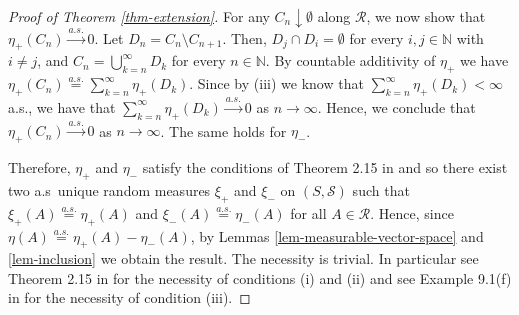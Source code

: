 \documentclass{article}
\theoremstyle{plain}
\theoremstyle{remark}
\begin{document}
\begin{proof}[Proof of Theorem \ref{thm-extension}]
	For any $C_n\downarrow\emptyset$ along $\mathcal{R}$, we now show that $\eta_+(C_n)\stackrel{a.s.}{\to}0$. Let $D_n=C_{n}\setminus C_{n+1}$. Then, $D_j\cap D_i=\emptyset$ for every $i,j\in\mathbb{N}$ with $i\neq j$, and $C_n=\bigcup_{k=n}^{\infty}D_k$ for every $n\in\mathbb{N}$. By countable additivity of $\eta_+$ we have $\eta_+(C_n)\stackrel{a.s.}{=}\sum_{k=n}^{\infty}\eta_+(D_k)$. Since by (iii) we know that $\sum_{k=n}^{\infty}\eta_+(D_k)<\infty$ a.s., we have that $\sum_{k=n}^{\infty}\eta_+(D_k)\stackrel{a.s.}{\to}0$ as $n\to\infty$. Hence, we conclude that $\eta_+(C_n)\stackrel{a.s.}{\to}0$ as $n\to\infty$. The same holds for $\eta_-$.
	
	Therefore, $\eta_+$ and $\eta_-$ satisfy the conditions of Theorem 2.15 in \cite{Kallenberg2} and so there exist two a.s~unique random measures $\xi_+$ and $\xi_-$ on $(S,\mathcal{S})$ such that $\xi_+(A)\stackrel{a.s.}{=}\eta_+(A)$ and $\xi_-(A)\stackrel{a.s.}{=}\eta_-(A)$ for all $A\in\mathcal{R}$. Hence, since $\eta(A)\stackrel{a.s.}{=}\eta_+(A)-\eta_-(A)$, by Lemmas \ref{lem-measurable-vector-space} and \ref{lem-inclusion} we obtain the result. The necessity is trivial. In particular see Theorem 2.15 in \cite{Kallenberg2} for the necessity of conditions (i) and (ii) and see Example 9.1(f) in \cite{Daley} for the necessity of condition (iii).
\end{proof}
\end{document}
